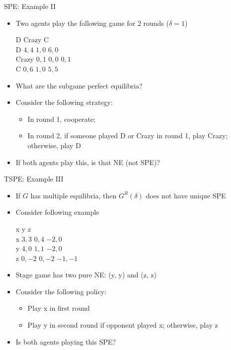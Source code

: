 \documentclass[11pt,aspectratio=169]{beamer}
\begin{document}
  \begin{frame}{SPE: Example II}
   \begin{itemize}[<+->]
    \item Two agents play the following game for 2 rounds ($\delta = 1$)
    \begin{center}
     \hspace{-3.5em}
     \begin{game}{3}{3}
      		\> D			\> Crazy		\> C			\\
      D		\> $4, 4$	\> $1, 0$	\> $6, 0$	\\
      Crazy	\> $0, 1$	\> $0, 0$	\> $0, 1$	\\
      C		\> $0, 6$	\> $1, 0$	\> $5, 5$
     \end{game}
    \end{center}
    \vspace{0.7em}  
    \item What are the subgame perfect equilibria?
    \item Consider the following strategy:
    \begin{itemize}[<.->]
     \item In round 1, cooperate;
     \item In round 2, if someone played D or Crazy in round 1, play Crazy; otherwise, play D
    \end{itemize}
    \item If both agents play this, is that NE (not SPE)?
   \end{itemize}
  \end{frame} 
  
  
  \begin{frame}{TSPE: Example III}
   \begin{itemize}
    \item  If $G$ has multiple equilibria, then $G^{R}(\delta)$ does not have unique SPE
    \item Consider following example
    \begin{center}
     \hspace{-3.5em}
     \begin{game}{3}{3}
      	\> x			\> y			\> z			\\
      x	\> $3, 3$	\> $0, 4$	\> $-2, 0$	\\
      y	\> $4, 0$	\> $1, 1$	\> $-2, 0$	\\
      z	\> $0, -2$	\> $0, -2$	\> $-1, -1$
     \end{game}
    \end{center}
    \vspace{0.7em}
    \item Stage game has two pure NE: (y, y) and (z, z)
    \item Consider the following policy:
    \begin{itemize}
     \item Play x in first round
     \item Play y in second round if opponent played x; otherwise, play z
    \end{itemize}
    \item Is both agents playing this SPE?
   \end{itemize}  
  \end{frame}
\end{document}
